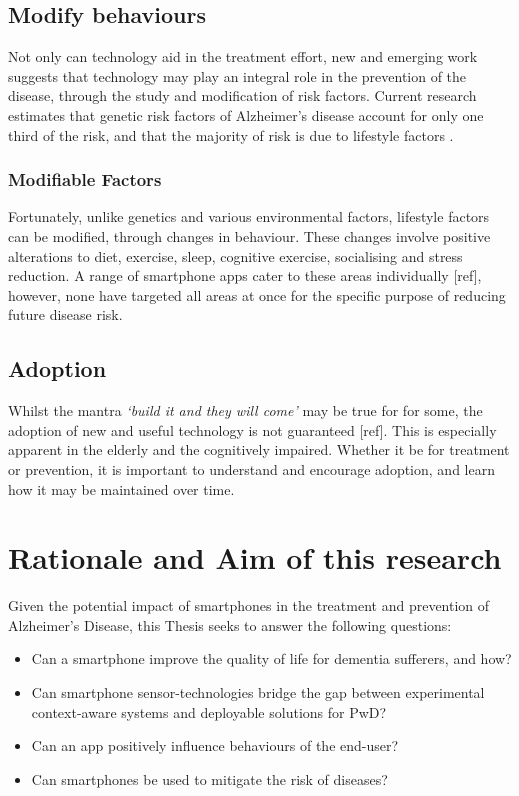 \subsection{Modify behaviours}
Not only can technology aid in the treatment effort, new and emerging work suggests that technology may play an integral role in the prevention of the disease, through the study and modification of risk factors. Current research estimates that genetic risk factors of Alzheimer's disease account for only one third of the risk, and that the majority of risk is due to lifestyle factors \cite{Ridge2013}. 

\subsubsection{Modifiable Factors}
Fortunately, unlike genetics and various environmental factors, lifestyle factors can be modified, through changes in behaviour. These changes involve positive alterations to diet, exercise, sleep, cognitive exercise, socialising and stress reduction. A range of smartphone apps cater to these areas individually [ref], however, none have targeted all areas at once for the specific purpose of reducing future disease risk.
\subsection{Adoption}
Whilst the mantra \textit{`build it and they will come'} may be true for for some, the adoption of new and useful technology is not guaranteed [ref]. This is especially apparent in the elderly and the cognitively impaired. Whether it be for treatment or prevention, it is important to understand and encourage adoption, and learn how it may be maintained over time.

\section{Rationale and Aim of this research}
Given the potential impact of smartphones in the treatment and prevention of Alzheimer's Disease, this Thesis seeks to answer the following questions:
\begin{itemize}
	\item Can a smartphone improve the quality of life for dementia sufferers, and how?
	\item Can smartphone sensor-technologies bridge the gap between experimental context-aware systems and deployable solutions for PwD?  
	\item Can an app positively influence behaviours of the end-user?
	\item Can smartphones be used to mitigate the risk of diseases?
\end{itemize}

